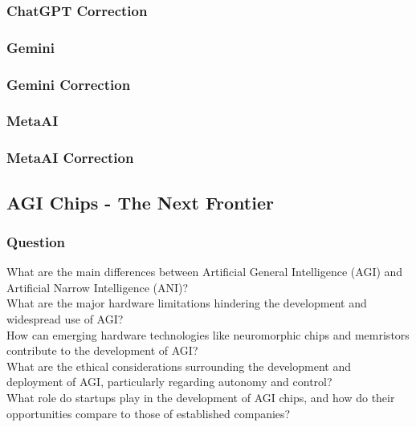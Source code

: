 \subsubsection{ChatGPT Correction}
\begin{tcolorbox}[breakable]
    
\end{tcolorbox}
\subsubsection{Gemini}
\begin{tcolorbox}[breakable]
    
\end{tcolorbox}
\subsubsection{Gemini Correction}
\begin{tcolorbox}[breakable]
    
\end{tcolorbox}
\subsubsection{MetaAI}
\begin{tcolorbox}[breakable]
    
\end{tcolorbox}
\subsubsection{MetaAI Correction}
\begin{tcolorbox}[breakable]
    
\end{tcolorbox}

\subsection{AGI Chips - The Next Frontier}
\subsubsection{Question}
\begin{tcolorbox}[breakable]
What are the main differences between Artificial General Intelligence (AGI) and Artificial Narrow Intelligence (ANI)?\\
What are the major hardware limitations hindering the development and widespread use of AGI?\\
How can emerging hardware technologies like neuromorphic chips and memristors contribute to the development of AGI?\\
What are the ethical considerations surrounding the development and deployment of AGI, particularly regarding autonomy and control?\\
What role do startups play in the development of AGI chips, and how do their opportunities compare to those of established companies?

\end{tcolorbox}
